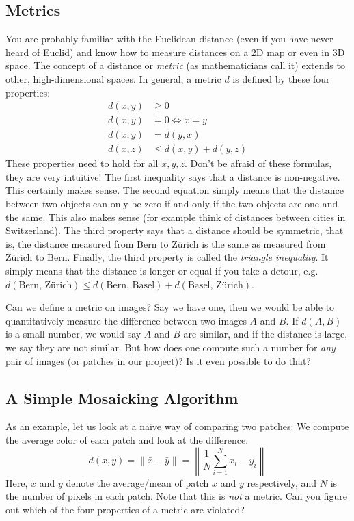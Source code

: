 \documentclass[a4paper]{article}
\begin{document}
	\subsection{Metrics}
		You are probably familiar with the Euclidean distance (even if you have never heard of Euclid) and know how to measure distances on a 2D map or even in 3D space. 
		The concept of a distance or \emph{metric} (as mathematicians call it) extends to other, high-dimensional spaces.
		In general, a metric $d$ is defined by these four properties:
		\begin{align}
			d(x, y) &\geq 0 \\
			d(x, y) &= 0 \iff x = y \\
			d(x, y) &= d(y, x) \\
			d(x, z) &\leq d(x, y) + d(y, z) 
		\end{align}
		These properties need to hold for all $x, y, z$.
		Don't be afraid of these formulas, they are very intuitive!
		The first inequality says that a distance is non-negative. 
		This certainly makes sense.
		The second equation simply means that the distance between two objects can only be zero if and only if the two objects are one and the same.
		This also makes sense (for example think of distances between cities in Switzerland).
		The third property says that a distance should be symmetric, that is, the distance measured from Bern to Z\"urich is the same as measured from Z\"urich to Bern.
		Finally, the third property is called the \emph{triangle inequality}. 
		It simply means that the distance is longer or equal if you take a detour, e.g.\@ 
		$d(\text{Bern, Z\"urich}) \leq d(\text{Bern, Basel}) + d(\text{Basel, Z\"urich})$.
		
		Can we define a metric on images? 
		Say we have one, then we would be able to quantitatively measure the difference between two images $A$ and $B$. 
		If $d(A, B)$ is a small number, we would say $A$ and $B$ are similar, and if the distance is large, we say they are not similar.
		But how does one compute such a number for \emph{any} pair of images (or patches in our project)?
		Is it even possible to do that?
		
	\subsection{A Simple Mosaicking Algorithm}\label{sec:simple-mosaicking}
		As an example, let us look at a naive way of comparing two patches: We compute the average color of each patch and look at the difference.
		\begin{equation}\label{eq:mean-color-distance}
			d(x, y) = \lVert \bar{x} - \bar{y} \rVert = \left\lVert \frac{1}{N} \sum_{i=1}^{N} x_i - y_i  \right\rVert
		\end{equation}
		Here, $\bar{x}$ and $\bar{y}$ denote the average/mean of patch $x$ and $y$ respectively, and $N$ is the number of pixels in each patch.
		Note that this is \emph{not} a metric. 
		Can you figure out which of the four properties of a metric are violated?
		
\end{document}
